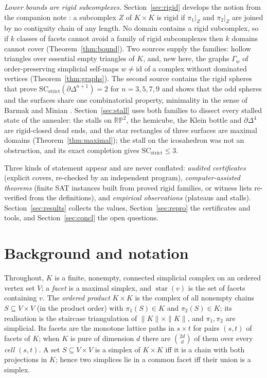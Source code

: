 \documentclass[12pt]{article}
\newcommand{\SC}{\mathrm{SC}}
\newcommand{\SCst}{\SC_{\mathrm{strict}}}
\begin{document}
\emph{Lower bounds are rigid subcomplexes.}  Section~\ref{sec:rigid}
develops the notion from the companion note \cite{PM26b}: a subcomplex $Z$
of $K\times K$ is rigid if $\pi_1|_Z$ and $\pi_2|_Z$ are joined by no
contiguity chain of any length.  No domain contains a rigid subcomplex, so if
$k$ classes of facets cannot avoid a family of rigid subcomplexes then $k$
domains cannot cover (Theorem~\ref{thm:bound}).  Two sources supply the
families: hollow triangles over essential empty triangles of $K$, and, new
here, the graphs $\Gamma_w$ of order-preserving simplicial self-maps
$w\ne\mathrm{id}$ of a complex without dominated vertices
(Theorem~\ref{thm:graphs}).  The second source contains the rigid spheres
that prove $\SCst(\partial\Delta^{n+1})=2$ for $n=3,5,7,9$ and shows that the
odd spheres and the surfaces share one combinatorial property, minimality in
the sense of Barmak and Minian \cite{BM12}.  Section~\ref{sec:stall} uses
both families to dissect every stalled state of the annealer: the stalls on
$\mathbb{RP}^2$, the hemicube, the Klein bottle and $\partial\Delta^4$ are
rigid-closed dead ends, and the star rectangles of three surfaces are
maximal domains (Theorem~\ref{thm:maximal}); the stall on the icosahedron was
not an obstruction, and its exact completion gives $\SCst\le3$.

Three kinds of statement appear and are never conflated: \emph{audited
certificates} (explicit covers, re-checked by an independent program),
\emph{computer-assisted theorems} (finite SAT instances built from proved
rigid families, or witness lists re-verified from the definitions), and
\emph{empirical observations} (plateaus and stalls).  Section~\ref{sec:results}
collects the values, Section~\ref{sec:repro} the certificates and tools, and
Section~\ref{sec:concl} the open questions.

\section{Background and notation}\label{sec:back}

Throughout, $K$ is a finite, nonempty, connected simplicial complex on an
ordered vertex set $V$; a \emph{facet} is a maximal simplex, and
$\operatorname{star}(v)$ is the set of facets containing $v$.  The
\emph{ordered product} $K\times K$ is the complex of all nonempty chains
$S\subseteq V\times V$ (in the product order) with $\pi_1(S)\in K$ and
$\pi_2(S)\in K$; its realisation is the staircase triangulation of
$\|K\|\times\|K\|$, and $\pi_1,\pi_2$ are simplicial.  Its facets are the
monotone lattice paths in $s\times t$ for pairs $(s,t)$ of facets of $K$;
when $K$ is pure of dimension $d$ there are $\binom{2d}{d}$ of them over
every \emph{cell} $(s,t)$.  A set $S\subseteq V\times V$ is a simplex of
$K\times K$ iff it is a chain with both projections in $K$; hence two
simplices lie in a common facet iff their union is a simplex.
\end{document}
